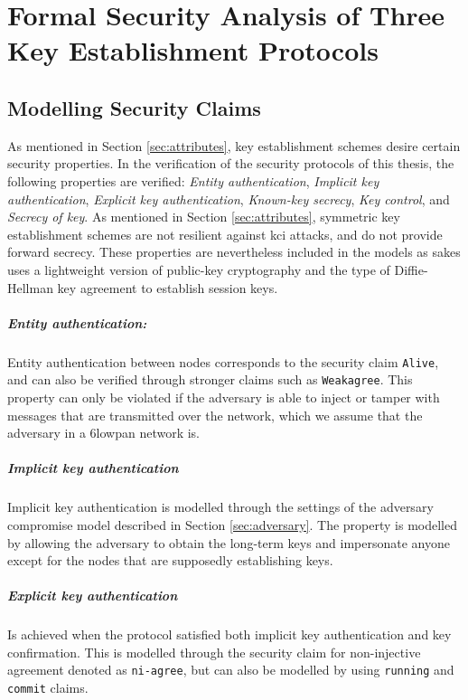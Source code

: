 \chapter{Formal Security Analysis of Three Key Establishment Protocols}
\label{chp:analysis}


\section{Modelling Security Claims}

As mentioned in Section \ref{sec:attributes}, key establishment schemes desire certain security properties. In the verification of the security protocols of this thesis, the following properties are verified: \emph{Entity authentication}, \emph{Implicit key authentication}, \emph{Explicit key authentication}, \emph{Known-key secrecy}, \emph{Key control}, and \emph{Secrecy of key}. As mentioned in Section \ref{sec:attributes}, symmetric key establishment schemes are not resilient against \gls{kci} attacks, and do not provide forward secrecy. These properties are nevertheless included in the models as \gls{sakes} uses a lightweight version of public-key cryptography and the type of Diffie-Hellman key agreement to establish session keys.

\paragraph{Entity authentication:} Entity authentication between nodes corresponds to the security claim \texttt{Alive}, and can also be verified through stronger claims such as \texttt{Weakagree}. This property can only be violated if the adversary is able to inject or tamper with messages that are transmitted over the network, which we assume that the adversary in a \gls{6lowpan} network is.

\paragraph{Implicit key authentication} Implicit key authentication is modelled through the settings of the adversary compromise model described in Section \ref{sec:adversary}. The property is modelled by allowing the adversary to obtain the long-term keys and impersonate anyone except for the nodes that are supposedly establishing keys.

\paragraph{Explicit key authentication} Is achieved when the protocol satisfied both implicit key authentication and key confirmation. This is modelled through the security claim for non-injective agreement denoted as \texttt{ni-agree}, but can also be modelled by using \texttt{running} and \texttt{commit} claims.

